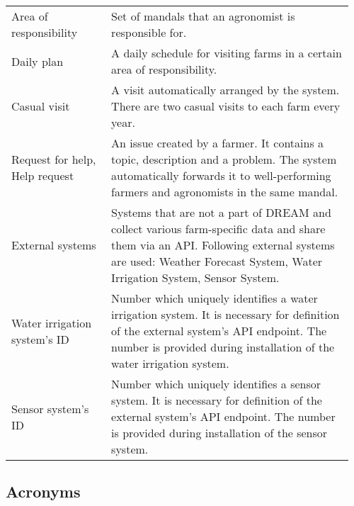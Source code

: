 \begin{center}
\begin{longtable}{@{}p{0.28\linewidth} p{0.68\linewidth}@{}}
        Area of responsibility  & Set of mandals that an agronomist is responsible for.\\
        Daily plan              & A daily schedule for visiting farms in a certain area of responsibility.\\
        Casual visit            & A visit automatically arranged by the system. There are two casual visits to each farm every year.\\
        Request for help, Help request & An issue created by a farmer. It contains a topic, description and a problem. The system automatically forwards it to well-performing farmers and agronomists in the same mandal.\\
        External systems        & Systems that are not a part of DREAM and collect various farm-specific data and share them via an API. Following external systems are used: Weather Forecast System, Water Irrigation System, Sensor System.\\
        Water irrigation system's ID    & Number which uniquely identifies a water irrigation system. It is necessary for definition of the external system's API endpoint. The number is provided during installation of the water irrigation system.  \\
        Sensor system's ID              & Number which uniquely identifies a sensor system. It is necessary for definition of the external system's API endpoint. The number is provided during installation of the sensor system. \\
		\midrule

	\end{longtable}
\end{center}

\subsection{Acronyms}

